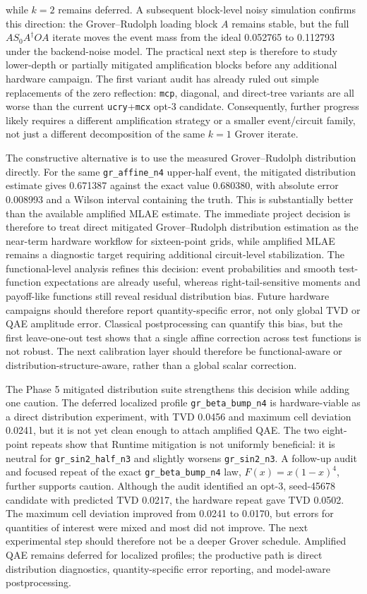 while \(k=2\) remains deferred. A subsequent block-level noisy simulation
confirms this direction: the Grover--Rudolph loading block \(A\) remains stable,
but the full \(AS_0A^\dagger OA\) iterate moves the event mass from the ideal
0.052765 to 0.112793 under the backend-noise model. The practical next step is
therefore to study lower-depth or partially mitigated amplification blocks
before any additional hardware campaign. The first variant audit has already
ruled out simple replacements of the zero reflection: \texttt{mcp}, diagonal,
and direct-tree variants are all worse than the current \texttt{ucry}+\texttt{mcx}
opt-3 candidate. Consequently, further progress likely requires a different
amplification strategy or a smaller event/circuit family, not just a different
decomposition of the same \(k=1\) Grover iterate.

The constructive alternative is to use the measured Grover--Rudolph
distribution directly. For the same \texttt{gr\_affine\_n4} upper-half event,
the mitigated distribution estimate gives 0.671387 against the exact value
0.680380, with absolute error 0.008993 and a Wilson interval containing the
truth. This is substantially better than the available amplified MLAE estimate.
The immediate project decision is therefore to treat direct mitigated
Grover--Rudolph distribution estimation as the near-term hardware workflow for
sixteen-point grids, while amplified MLAE remains a diagnostic target requiring
additional circuit-level stabilization. The functional-level analysis refines
this decision: event probabilities and smooth test-function expectations are already useful,
whereas right-tail-sensitive moments and payoff-like functions still reveal
residual distribution bias. Future hardware campaigns should therefore report
quantity-specific error, not only global TVD or QAE amplitude error.
Classical postprocessing can quantify this bias, but the first leave-one-out
test shows that a single affine correction across test functions is not robust.
The next calibration layer should therefore be functional-aware or
distribution-structure-aware, rather than a global scalar correction.

The Phase 5 mitigated distribution suite strengthens this decision while adding
one caution. The deferred localized profile \texttt{gr\_beta\_bump\_n4} is
hardware-viable as a direct distribution experiment, with TVD 0.0456 and maximum
cell deviation 0.0241, but it is not yet clean enough to attach amplified QAE.
The two eight-point repeats show that Runtime mitigation is not uniformly
beneficial: it is neutral for \texttt{gr\_sin2\_half\_n3} and slightly worsens
\texttt{gr\_sin2\_n3}. A follow-up audit and focused repeat of the exact
\texttt{gr\_beta\_bump\_n4} law, \(F(x)=x(1-x)^4\), further supports caution.
Although the audit identified an opt-3, seed-45678 candidate with predicted TVD
0.0217, the hardware repeat gave TVD 0.0502. The maximum cell deviation improved
from 0.0241 to 0.0170, but errors for quantities of interest were mixed and most did not
improve. The next experimental step should therefore not be a deeper Grover
schedule. Amplified QAE remains deferred for localized profiles; the productive
path is direct distribution diagnostics, quantity-specific error reporting,
and model-aware postprocessing.

